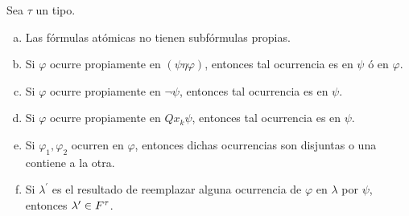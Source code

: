   \begin{lemma} \label{lemma_42}
    \PN Sea $\tau$ un tipo.
    \begin{enumerate}[(a)]
      \item Las fórmulas atómicas no tienen subfórmulas propias.
      \item Si $\varphi$ ocurre propiamente en $(\psi \eta \varphi)$, entonces tal ocurrencia es en $\psi$ ó en
        $\varphi$.
      \item Si $\varphi$ ocurre propiamente en $\lnot \psi$, entonces tal ocurrencia es en $\psi$.
      \item Si $\varphi$ ocurre propiamente en $Qx_{k} \psi$, entonces tal ocurrencia es en $\psi$.
      \item Si $\varphi_{1}, \varphi_{2}$ ocurren en $\varphi$, entonces dichas ocurrencias son disjuntas o una contiene
        a la otra.
      \item Si $\lambda^{\prime}$ es el resultado de reemplazar alguna ocurrencia de $\varphi$ en $\lambda$ por $\psi$,
        entonces $\lambda^{\prime} \in F^{\tau}$.
    \end{enumerate}
  \end{lemma}
